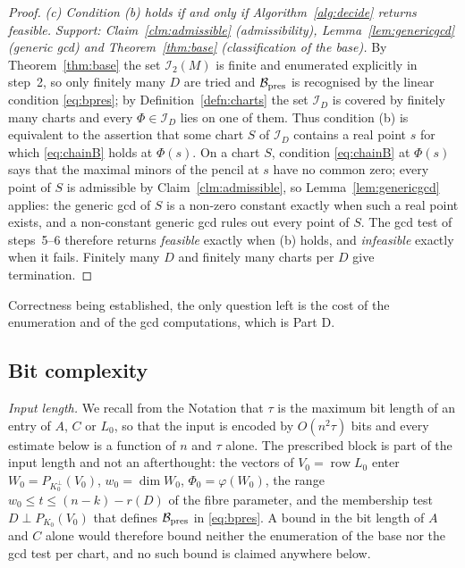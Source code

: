 \documentclass[journal]{IEEEtran}
\theoremstyle{plainn}
\theoremstyle{remark}
\newcommand{\row}{\operatorname{row}}
\begin{document}
\begin{proof}
\emph{(c) Condition (b) holds if and only if Algorithm~\ref{alg:decide} returns \emph{feasible}.}
\emph{Support: Claim~\ref{clm:admissible} (admissibility), Lemma~\ref{lem:genericgcd} (generic gcd) and
Theorem~\ref{thm:base} (classification of the base).} By Theorem~\ref{thm:base} the set $\mathcal I_2(M)$ is
finite and enumerated explicitly in step~2, so only finitely many $D$ are tried and
$\mathcal B_{\rm pres}$ is recognised by the linear condition \eqref{eq:bpres}; by
Definition~\ref{defn:charts} the set $\mathcal I_D$ is covered by finitely many charts and every
$\Phi\in\mathcal I_D$ lies on one of them. Thus condition (b) is equivalent to the assertion that some chart
$S$ of $\mathcal I_D$ contains a real point $s$ for which \eqref{eq:chainB} holds at $\Phi(s)$.
On a chart $S$, condition \eqref{eq:chainB} at $\Phi(s)$ says that the maximal minors of the pencil at $s$
have no common zero; every point of $S$ is admissible by Claim~\ref{clm:admissible}, so
Lemma~\ref{lem:genericgcd} applies: the generic gcd of $S$ is a non-zero constant exactly when such a real
point exists, and a non-constant generic gcd rules out every point of $S$. The gcd test of steps~5--6
therefore returns \emph{feasible} exactly when (b) holds, and \emph{infeasible} exactly when it fails.
Finitely many $D$ and finitely many charts per $D$ give termination.
\end{proof}

Correctness being established, the only question left is the cost of the enumeration and of the gcd
computations, which is Part D.

\subsection{Bit complexity}\label{sec:complexity}

\emph{Input length.} We recall from the Notation that $\tau$ is the maximum bit length of an entry of $A$,
$C$ or $L_0$, so that the input is encoded by $O(n^2\tau)$ bits and every estimate below is a function of
$n$ and $\tau$ alone. The prescribed block is part of the input length and not an afterthought: the vectors
of $V_0=\row L_0$ enter $W_0=P_{K_0^\perp}(V_0)$, $w_0=\dim W_0$, $\Phi_0=\varphi(W_0)$, the range
$w_0\le t\le(n-k)-r(D)$ of the fibre parameter, and the membership test $D\perp P_{K_0}(V_0)$ that defines
$\mathcal B_{\rm pres}$ in \eqref{eq:bpres}. A bound in the bit length of $A$ and $C$ alone would therefore
bound neither the enumeration of the base nor the gcd test per chart, and no such bound is claimed anywhere
below.
\end{document}
